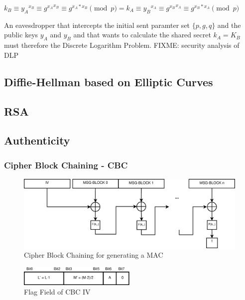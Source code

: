\begin{center}
 $k_B \equiv {y_A}^{x_B} \equiv {g^{x_A}}^{x_B} \equiv g^{x_A*x_B} \pmod p = k_A \equiv {y_B}^{x_A} \equiv g{^{x_B}}^{x_A} \equiv g^{x_B*x_A} \pmod p $
\end{center}

An eavesdropper that intercepts the initial sent paramter set $\{p, g, q\}$ and the public keys $y_A$ and $y_B$ and that wants to calculate the shared secret
$k_A = K_B$  must therefore the Discrete Logarithm Problem. FIXME: security analysis of DLP

\subsection{Diffie-Hellman based on Elliptic Curves}

\subsection{RSA}

\cite{RSA}

\subsection{Authenticity}\label{authenticity}

\subsubsection{Cipher Block Chaining - CBC}\label{cbcAuth}


\begin{figure}\label{cbcMAC}
    \centering
    \includegraphics[width=1\textwidth]{figures/CBCMac.eps}
    \caption{Cipher Block Chaining for generating a MAC}
    \label{fig:cbc_MAC}
\end{figure}

\begin{figure}\label{cbcMACFlags}
    \centering
    \includegraphics[width=0.5\textwidth]{figures/CBCIVFlags.eps}
    \caption{Flag Field of CBC IV}
    \label{fig:cbc_Flags}
\end{figure}

